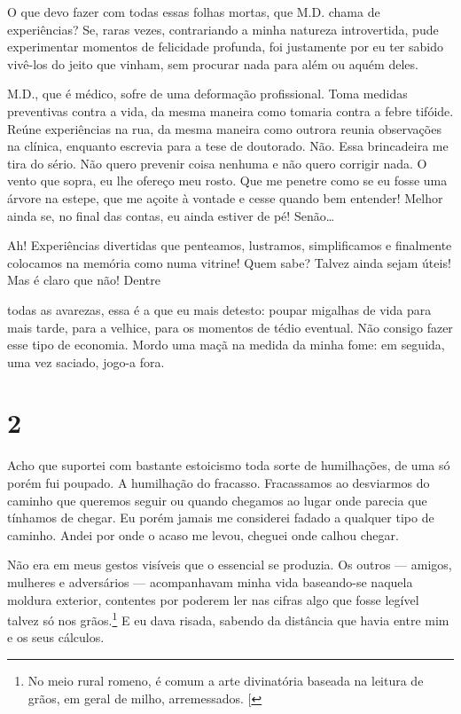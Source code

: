 O que devo fazer com todas essas folhas mortas, que M.D. chama de
experiências? Se, raras vezes, contrariando a minha natureza
introvertida, pude experimentar momentos de felicidade profunda, foi
justamente por eu ter sabido vivê-los do jeito que vinham, sem procurar
nada para além ou aquém deles.

M.D., que é médico, sofre de uma deformação profissional. Toma medidas
preventivas contra a vida, da mesma maneira como tomaria contra a febre
tifóide. Reúne experiências na rua, da mesma maneira como outrora reunia
observações na clínica, enquanto escrevia para a tese de doutorado. Não.
Essa brincadeira me tira do sério. Não quero prevenir coisa nenhuma e
não quero corrigir nada. O vento que sopra, eu lhe ofereço meu rosto.
Que me penetre como se eu fosse uma árvore na estepe, que me açoite à
vontade e cesse quando bem entender! Melhor ainda se, no final das
contas, eu ainda estiver de pé! Senão\ldots{}

Ah! Experiências divertidas que penteamos, lustramos, simplificamos e
finalmente colocamos na memória como numa vitrine! Quem sabe? Talvez
ainda sejam úteis! Mas é claro que não! Dentre

todas as avarezas, essa é a que eu mais detesto: poupar migalhas de vida
para mais tarde, para a velhice, para os momentos de tédio eventual. Não
consigo fazer esse tipo de economia. Mordo uma maçã na medida da minha
fome: em seguida, uma vez saciado, jogo-a fora.

\section{2}

Acho que suportei com bastante estoicismo toda sorte de humilhações, de
uma só porém fui poupado. A humilhação do fracasso. Fracassamos ao
desviarmos do caminho que queremos seguir ou quando chegamos ao lugar
onde parecia que tínhamos de chegar. Eu porém jamais me considerei
fadado a qualquer tipo de caminho. Andei por onde o acaso me levou,
cheguei onde calhou chegar.

Não era em meus gestos visíveis que o essencial se produzia. Os outros ---
amigos, mulheres e adversários --- acompanhavam minha vida baseando-se
naquela moldura exterior, contentes por poderem ler nas cifras algo que
fosse legível talvez só nos grãos.\footnote{No meio
rural romeno, é comum a arte divinatória baseada na leitura de grãos, em
geral de milho, arremessados. {[}\versal{N.~T.}{]}} E eu dava risada, sabendo da distância
que havia entre mim e os seus cálculos.


